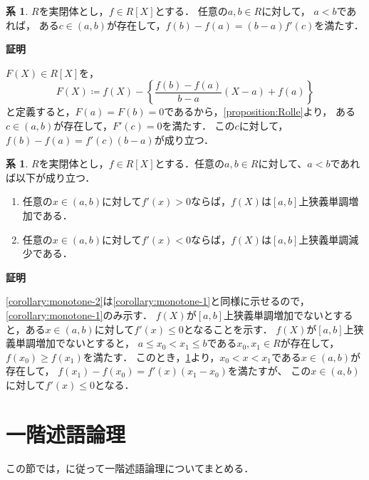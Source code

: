 \documentclass[uplatex, dvipdfmx]{jsarticle}
\makeatletter
\numberwithin{equation}{section}
\renewenvironment{proof}[1][\proofname]{\par
  \pushQED{\qed}%
  \normalfont \topsep6\p@\@plus6\p@\relax
  \trivlist
  \item\relax
  {\bfseries
  #1\@addpunct{.}}\hspace\labelsep\ignorespaces
}{
  \popQED\endtrivlist\@endpefalse
}
\theoremstyle{definition}
\newtheorem{corollary}[definition]{系}
\renewcommand{\proofname}{\textbf{証明}}
\makeatother
\begin{document}
\begin{corollary}\label{corollary:mean-value}
     $R$を実閉体とし，$f \in R[X]$とする．
     任意の$a, b \in R$に対して，
     $a<b$であれば，
     ある$c \in (a,b)$が存在して，$f(b)-f(a) = (b-a)f'(c)$を満たす．
\end{corollary}

\begin{proof}
     $F(X) \in R[X]$を，
     \begin{equation}
          F(X) \coloneqq f(X) - \left\{\frac{f(b)-f(a)}{b-a}(X-a) + f(a)\right\}
     \end{equation}
     と定義すると，$F(a)=F(b)=0$であるから，\cref{proposition:Rolle}より，
     ある$c \in (a,b)$が存在して，$F'(c)=0$を満たす．
     この$c$に対して，$f(b)-f(a)=f'(c)(b-a)$が成り立つ．
\end{proof}

\begin{corollary}\label{corollary:monotone}
     $R$を実閉体とし，$f \in R[X]$とする．任意の$a, b \in R$に対して、$a<b$であれば以下が成り立つ．
     \begin{enumerate}
          \item \label{corollary:monotone-1}
          任意の$x \in (a,b)$に対して$f'(x)>0$ならば，$f(X)$は$[a,b]$上狭義単調増加である．
          \item \label{corollary:monotone-2}
          任意の$x \in (a,b)$に対して$f'(x)<0$ならば，$f(X)$は$[a,b]$上狭義単調減少である．
     \end{enumerate}
\end{corollary}
\begin{proof}
     \ref{corollary:monotone-2}は\ref{corollary:monotone-1}と同様に示せるので，\ref{corollary:monotone-1}のみ示す．
     $f(X)$が$[a,b]$上狭義単調増加でないとすると，ある$x \in (a,b)$に対して$f'(x) \leq 0$となることを示す．
     $f(X)$が$[a,b]$上狭義単調増加でないとすると，
     $a \leq x_0 < x_1 \leq b$である$x_0, x_1 \in R$が存在して，$f(x_0) \geq f(x_1)$を満たす．
     このとき，\cref{corollary:mean-value}より，$x_0 < x < x_1$である$x \in (a,b)$が存在して，
     $f(x_1) - f(x_0) = f'(x)(x_1 - x_0)$を満たすが、
     この$x \in (a,b)$に対して$f'(x) \leq 0$となる．
\end{proof}

\section{一階述語論理}\label{section:3}

この節では，\cite{MR1924282}に従って一階述語論理についてまとめる．
\end{document}

